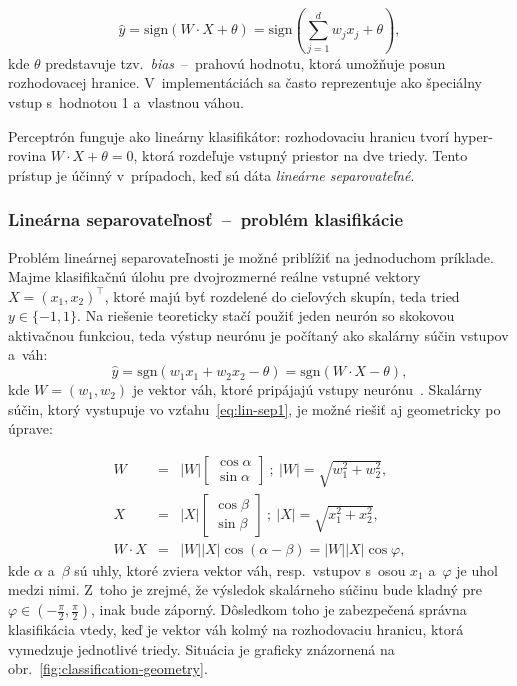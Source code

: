   \begin{equation}
    \hat{y} = \mathrm{sign}(W \cdot X + \theta) = \mathrm{sign}\left(\sum_{j=1}^{d} w_j x_j + \theta \right),
  \end{equation}
  kde $\theta$ predstavuje tzv.\ \emph{bias}~--~prahovú hodnotu, ktorá umožňuje posun rozhodovacej hranice. V~implementáciách sa často reprezentuje ako špeciálny vstup s~hodnotou 1 a~vlastnou váhou.

  Perceptrón funguje ako lineárny klasifikátor: rozhodovaciu hranicu tvorí hyper-rovina \( W \cdot X + \theta = 0 \), ktorá rozdeľuje vstupný priestor na dve triedy. Tento prístup je účinný v~prípadoch, keď sú dáta \emph{lineárne separovateľné}.

  \subsubsection{Lineárna separovateľnosť~--~problém klasifikácie}\label{ssec:lin-sep}

  Problém lineárnej separovateľnosti je možné priblížiť na jednoduchom príklade. Majme klasifikačnú úlohu pre dvojrozmerné reálne vstupné vektory $X = {(x_1, x_2)}^{\top}$, ktoré majú byť rozdelené do cieľových skupín, teda tried $y \in \{-1, 1\}$. Na riešenie teoreticky stačí použiť jeden neurón so skokovou aktivačnou funkciou, teda výstup neurónu je počítaný ako skalárny súčin vstupov a~váh:
  \begin{equation}
    \hat y = \mathrm{sgn}(w_1 x_1 + w_2 x_2 - \theta) = \mathrm{sgn}(W \cdot X - \theta),
    \label{eq:lin-sep1}
  \end{equation}
  kde $W = {(w_1, w_2)}$ je vektor váh, ktoré pripájajú vstupy neurónu~\cite{mehligMachineLearningNeural2021}. Skalárny súčin, ktorý vystupuje vo vzťahu~\ref{eq:lin-sep1}, je možné riešiť aj geometricky po úprave:
  
  \begin{eqnarray}
    W &=& |W|
    \begin{bmatrix}
      \cos \alpha \\ \sin \alpha
    \end{bmatrix}
    \ ;\ |W| = \sqrt{w_1^2 + w_2^2}, \nonumber \\
    X &=& |X|
    \begin{bmatrix}
      \cos \beta \\ \sin \beta
    \end{bmatrix}
    \ ;\ |X| = \sqrt{x_1^2 + x_2^2}, \nonumber \\
    W \cdot X &=& |W||X| \cos (\alpha - \beta) = |W||X| \cos \varphi,
  \end{eqnarray}
  kde $\alpha$ a~$\beta$ sú uhly, ktoré zviera vektor váh, resp.\ vstupov s~osou $x_1$ a~$\varphi$ je uhol medzi nimi. Z~toho je zrejmé, že výsledok skalárneho súčinu bude kladný pre $\varphi \in (-\frac{\pi}{2}, \frac{\pi}{2})$, inak bude záporný. Dôsledkom toho je zabezpečená správna klasifikácia vtedy, keď je vektor váh kolmý na rozhodovaciu hranicu, ktorá vymedzuje jednotlivé triedy. Situácia je graficky znázornená na obr.~\ref{fig:classification-geometry}.

